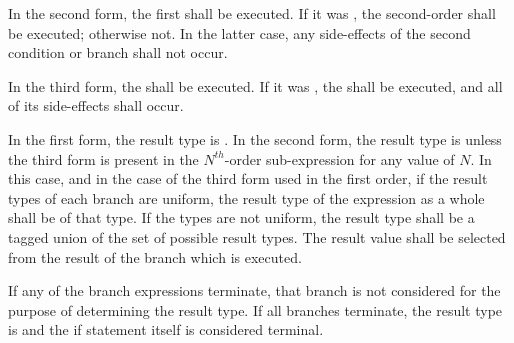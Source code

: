 \specsubsubitem
In the second form, the first  shall be
executed. If it was , the second-order
 shall be executed; otherwise not. In the latter
case, any side-effects of the second condition or branch shall not occur.

\specsubsubitem
In the third form, the  shall be executed. If
it was , the  shall be
executed, and all of its side-effects shall occur.

\specsubsubitem
In the first form, the result type is . In the second form, the
result type is  unless the third form is present in the
$N^{th}$-order sub-expression for any value of $N$. In this case, and in the
case of the third form used in the first order, if the result types of each
branch are uniform, the result type of the expression as a whole shall be of
that type. If the types are not uniform, the result type shall be a tagged
union of the set of possible result types. The result value shall be selected
from the result of the branch which is executed.

\specsubsubitem
If any of the branch expressions terminate, that branch is not considered for
the purpose of determining the result type. If all branches terminate, the
result type is  and the if statement itself is considered
terminal.


\begin{grammar}
 \\
	  \terminal{(}  \terminal{)}  \\

 \\
	 \\
	 \terminal{;}  \\
	 \terminal{;}  \terminal{;}  \\

\exactly \\
	\terminal{:}  \\
\end{grammar}

